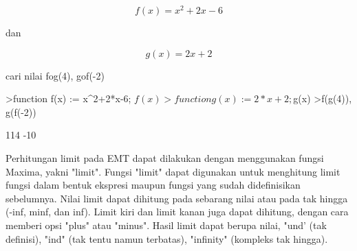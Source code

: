 \documentclass[a4paper,10pt]{article}
\begin{document}
\begin{eulernotebook}
\begin{eulercomment}
\begin{eulercomment}
\begin{eulercomment}
\begin{eulercomment}
\begin{eulercomment}
\begin{eulercomment}
\begin{eulercomment}
\end{eulercomment}
\begin{eulerformula}
\[
f(x)=x^2+2x-6
\]
\end{eulerformula}
\begin{eulercomment}
dan\\
\end{eulercomment}
\begin{eulerformula}
\[
g(x)=2x+2
\]
\end{eulerformula}
\begin{eulercomment}
cari nilai fog(4), gof(-2)
\end{eulercomment}
\begin{eulerprompt}
>function f(x) := x^2+2*x-6; $f(x)
>function g(x) := 2*x+2; $g(x)
>f(g(4)), g(f(-2))
\end{eulerprompt}
\begin{euleroutput}
  114
  -10
\end{euleroutput}
\begin{eulercomment}
Perhitungan limit pada EMT dapat dilakukan dengan menggunakan fungsi
Maxima, yakni "limit". Fungsi "limit" dapat digunakan untuk menghitung
limit fungsi dalam bentuk ekspresi maupun fungsi yang sudah
didefinisikan sebelumnya. Nilai limit dapat dihitung pada sebarang
nilai atau pada tak hingga (-inf, minf, dan inf). Limit kiri dan limit
kanan juga dapat dihitung, dengan cara memberi opsi "plus" atau
"minus". Hasil limit dapat berupa nilai, "und’ (tak definisi), "ind"
(tak tentu namun terbatas), "infinity" (kompleks tak hingga).


\end{eulercomment}
\end{eulercomment}
\end{eulercomment}
\end{eulercomment}
\end{eulercomment}
\end{eulercomment}
\end{eulercomment}
\end{eulernotebook}
\end{document}
